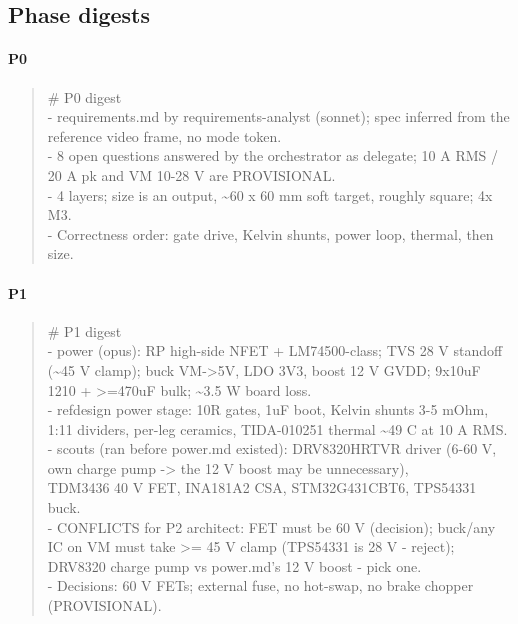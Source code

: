 \documentclass[11pt,a4paper]{article}
\begin{document}
\subsection*{Phase digests}
\paragraph*{P0}
\begin{quote}\small\ttfamily\raggedright
\# P0 digest\\
- requirements.md by requirements-analyst (sonnet); spec inferred from the reference video frame, no mode token.\\
- 8 open questions answered by the orchestrator as delegate; 10 A RMS / 20 A pk and VM 10-28 V are PROVISIONAL.\\
- 4 layers; size is an output, \textasciitilde{}60 x 60 mm soft target, roughly square; 4x M3.\\
- Correctness order: gate drive, Kelvin shunts, power loop, thermal, then size.
\end{quote}
\paragraph*{P1}
\begin{quote}\small\ttfamily\raggedright
\# P1 digest\\
- power (opus): RP high-side NFET + LM74500-class; TVS 28 V standoff (\textasciitilde{}45 V clamp); buck VM-\textgreater{}5V, LDO 3V3, boost 12 V GVDD; 9x10uF 1210 + \textgreater{}=470uF bulk; \textasciitilde{}3.5 W board loss.\\
- refdesign power stage: 10R gates, 1uF boot, Kelvin shunts 3-5 mOhm, 1:11 dividers, per-leg ceramics, TIDA-010251 thermal \textasciitilde{}49 C at 10 A RMS.\\
- scouts (ran before power.md existed): DRV8320HRTVR driver (6-60 V, own charge pump -\textgreater{} the 12 V boost may be unnecessary),\\
  TDM3436 40 V FET, INA181A2 CSA, STM32G431CBT6, TPS54331 buck.\\
- CONFLICTS for P2 architect: FET must be 60 V (decision); buck/any IC on VM must take \textgreater{}= 45 V clamp (TPS54331 is 28 V - reject);\\
  DRV8320 charge pump vs power.md's 12 V boost - pick one.\\
- Decisions: 60 V FETs; external fuse, no hot-swap, no brake chopper (PROVISIONAL).
\end{quote}
\end{document}
